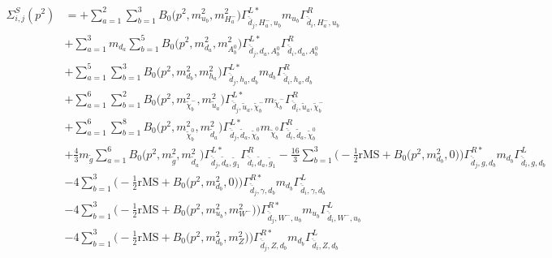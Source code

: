 \begin{itemize}
\begin{align} 
\Sigma^S_{i,j}(p^2) &= +\sum_{a=1}^{2}\sum_{b=1}^{3}{B_0\Big(p^{2},m^2_{u_{{b}}},m^2_{H^-_{{a}}}\Big)} {\Gamma^{L*}_{\check{\bar{d}}_{{j}},H^-_{{a}},u_{{b}}}} m_{u_{{b}}} {\Gamma^R_{\check{\bar{d}}_{{i}},H^-_{{a}},u_{{b}}}} \nonumber \\ 
 &+\sum_{a=1}^{3}m_{d_{{a}}} \sum_{b=1}^{5}{B_0\Big(p^{2},m^2_{d_{{a}}},m^2_{A^0_{{b}}}\Big)} {\Gamma^{L*}_{\check{\bar{d}}_{{j}},d_{{a}},A^0_{{b}}}} {\Gamma^R_{\check{\bar{d}}_{{i}},d_{{a}},A^0_{{b}}}}  \nonumber \\ 
 &+\sum_{a=1}^{5}\sum_{b=1}^{3}{B_0\Big(p^{2},m^2_{d_{{b}}},m^2_{h_{{a}}}\Big)} {\Gamma^{L*}_{\check{\bar{d}}_{{j}},h_{{a}},d_{{b}}}} m_{d_{{b}}} {\Gamma^R_{\check{\bar{d}}_{{i}},h_{{a}},d_{{b}}}} \nonumber \\ 
 &+\sum_{a=1}^{6}\sum_{b=1}^{2}{B_0\Big(p^{2},m^2_{\tilde{\chi}^-_{{b}}},m^2_{\tilde{u}_{{a}}}\Big)} {\Gamma^{L*}_{\check{\bar{d}}_{{j}},\tilde{u}_{{a}},\tilde{\chi}^-_{{b}}}} m_{\tilde{\chi}^-_{{b}}} {\Gamma^R_{\check{\bar{d}}_{{i}},\tilde{u}_{{a}},\tilde{\chi}^-_{{b}}}} \nonumber \\ 
 &+\sum_{a=1}^{6}\sum_{b=1}^{8}{B_0\Big(p^{2},m^2_{\tilde{\chi}^0_{{b}}},m^2_{\tilde{d}_{{a}}}\Big)} {\Gamma^{L*}_{\check{\bar{d}}_{{j}},\tilde{d}_{{a}},\tilde{\chi}^0_{{b}}}} m_{\tilde{\chi}^0_{{b}}} {\Gamma^R_{\check{\bar{d}}_{{i}},\tilde{d}_{{a}},\tilde{\chi}^0_{{b}}}} \nonumber \\ 
 &+\frac{4}{3} m_{\tilde{g}} \sum_{a=1}^{6}{B_0\Big(p^{2},m^2_{\tilde{g}},m^2_{\tilde{d}_{{a}}}\Big)} {\Gamma^{L*}_{\check{\bar{d}}_{{j}},\tilde{d}_{{a}},\tilde{g}_{{1}}}} {\Gamma^R_{\check{\bar{d}}_{{i}},\tilde{d}_{{a}},\tilde{g}_{{1}}}}  -\frac{16}{3} \sum_{b=1}^{3}\Big(-\frac{1}{2} \text{rMS}  + {B_0\Big(p^{2},m^2_{d_{{b}}},0\Big)}\Big){\Gamma^{R*}_{\check{\bar{d}}_{{j}},g,d_{{b}}}} m_{d_{{b}}} {\Gamma^L_{\check{\bar{d}}_{{i}},g,d_{{b}}}}  \nonumber \\ 
 &-4 \sum_{b=1}^{3}\Big(-\frac{1}{2} \text{rMS}  + {B_0\Big(p^{2},m^2_{d_{{b}}},0\Big)}\Big){\Gamma^{R*}_{\check{\bar{d}}_{{j}},\gamma,d_{{b}}}} m_{d_{{b}}} {\Gamma^L_{\check{\bar{d}}_{{i}},\gamma,d_{{b}}}}  \nonumber \\ 
 &-4 \sum_{b=1}^{3}\Big(-\frac{1}{2} \text{rMS}  + {B_0\Big(p^{2},m^2_{u_{{b}}},m^2_{W^-}\Big)}\Big){\Gamma^{R*}_{\check{\bar{d}}_{{j}},W^-,u_{{b}}}} m_{u_{{b}}} {\Gamma^L_{\check{\bar{d}}_{{i}},W^-,u_{{b}}}}  \nonumber \\ 
 &-4 \sum_{b=1}^{3}\Big(-\frac{1}{2} \text{rMS}  + {B_0\Big(p^{2},m^2_{d_{{b}}},m^2_{Z}\Big)}\Big){\Gamma^{R*}_{\check{\bar{d}}_{{j}},Z,d_{{b}}}} m_{d_{{b}}} {\Gamma^L_{\check{\bar{d}}_{{i}},Z,d_{{b}}}}  \nonumber \\ 

\end{align}
\end{itemize}
